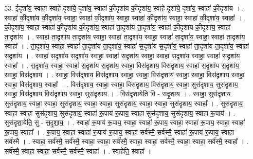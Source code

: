 \documentclass[17pt]{extarticle}
\begin{document}
53. ई॒दृशा॑य॒ स्वाहा॒ स्वाहे॒ दृशा॑ये॒ दृशा॑य॒ स्वाहा॑ की॒दृशा॑य की॒दृशा॑य॒ स्वाहे॒ दृशा॑ये॒ दृशा॑य॒ स्वाहा॑ की॒दृशा॑य । . स्वाहा॑ की॒दृशा॑य की॒दृशा॑य॒ स्वाहा॒ स्वाहा॑ की॒दृशा॑य॒ स्वाहा॒ स्वाहा॑ की॒दृशा॑य॒ स्वाहा॒ स्वाहा॑ की॒दृशा॑य॒ स्वाहा᳚ । . की॒दृशा॑य॒ स्वाहा॒ स्वाहा॑ की॒दृशा॑य की॒दृशा॑य॒ स्वाहा॑ ता॒दृशा॑य ता॒दृशा॑य॒ स्वाहा॑ की॒दृशा॑य की॒दृशा॑य॒ स्वाहा॑ ता॒दृशा॑य । . स्वाहा॑ ता॒दृशा॑य ता॒दृशा॑य॒ स्वाहा॒ स्वाहा॑ ता॒दृशा॑य॒ स्वाहा॒ स्वाहा॑ ता॒दृशा॑य॒ स्वाहा॒ स्वाहा॑ ता॒दृशा॑य॒ स्वाहा᳚ । . ता॒दृशा॑य॒ स्वाहा॒ स्वाहा॑ ता॒दृशा॑य ता॒दृशा॑य॒ स्वाहा॑ स॒दृशा॑य स॒दृशा॑य॒ स्वाहा॑ ता॒दृशा॑य ता॒दृशा॑य॒ स्वाहा॑ स॒दृशा॑य । . स्वाहा॑ स॒दृशा॑य स॒दृशा॑य॒ स्वाहा॒ स्वाहा॑ स॒दृशा॑य॒ स्वाहा॒ स्वाहा॑ स॒दृशा॑य॒ स्वाहा॒ स्वाहा॑ स॒दृशा॑य॒ स्वाहा᳚ । . स॒दृशा॑य॒ स्वाहा॒ स्वाहा॑ स॒दृशा॑य स॒दृशा॑य॒ स्वाहा॒ विस॑दृशाय॒ विस॑दृशाय॒ स्वाहा॑ स॒दृशा॑य स॒दृशा॑य॒ स्वाहा॒ विस॑दृशाय । . स्वाहा॒ विस॑दृशाय॒ विस॑दृशाय॒ स्वाहा॒ स्वाहा॒ विस॑दृशाय॒ स्वाहा॒ स्वाहा॒ विस॑दृशाय॒ स्वाहा॒ स्वाहा॒ विस॑दृशाय॒ स्वाहा᳚ । . विस॑दृशाय॒ स्वाहा॒ स्वाहा॒ विस॑दृशाय॒ विस॑दृशाय॒ स्वाहा॒ सुस॑दृशाय॒ सुस॑दृशाय॒ स्वाहा॒ विस॑दृशाय॒ विस॑दृशाय॒ स्वाहा॒ सुस॑दृशाय । . विस॑दृशा॒येति॒ वि - स॒दृ॒शा॒य॒ । . स्वाहा॒ सुस॑दृशाय॒ सुस॑दृशाय॒ स्वाहा॒ स्वाहा॒ सुस॑दृशाय॒ स्वाहा॒ स्वाहा॒ सुस॑दृशाय॒ स्वाहा॒ स्वाहा॒ सुस॑दृशाय॒ स्वाहा᳚ । . सुस॑दृशाय॒ स्वाहा॒ स्वाहा॒ सुस॑दृशाय॒ सुस॑दृशाय॒ स्वाहा॑ रू॒पाय॑ रू॒पाय॒ स्वाहा॒ सुस॑दृशाय॒ सुस॑दृशाय॒ स्वाहा॑ रू॒पाय॑ । . सुस॑दृशा॒येति॒ सु - स॒दृ॒शा॒य॒ । . स्वाहा॑ रू॒पाय॑ रू॒पाय॒ स्वाहा॒ स्वाहा॑ रू॒पाय॒ स्वाहा॒ स्वाहा॑ रू॒पाय॒ स्वाहा॒ स्वाहा॑ रू॒पाय॒ स्वाहा᳚ । . रू॒पाय॒ स्वाहा॒ स्वाहा॑ रू॒पाय॑ रू॒पाय॒ स्वाहा॒ सर्व॑स्मै॒ सर्व॑स्मै॒ स्वाहा॑ रू॒पाय॑ रू॒पाय॒ स्वाहा॒ सर्व॑स्मै । . स्वाहा॒ सर्व॑स्मै॒ सर्व॑स्मै॒ स्वाहा॒ स्वाहा॒ सर्व॑स्मै॒ स्वाहा॒ स्वाहा॒ सर्व॑स्मै॒ स्वाहा॒ स्वाहा॒ सर्व॑स्मै॒ स्वाहा᳚ । . सर्व॑स्मै॒ स्वाहा॒ स्वाहा॒ सर्व॑स्मै॒ सर्व॑स्मै॒ स्वाहा᳚ । . स्वाहेति॒ स्वाहा᳚ । \newline
\pagebreak
{}
\end{document}
